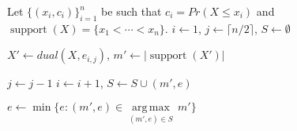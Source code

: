 \documentclass[letterpaper]{article} %
\DeclareMathOperator{\supp}{support}
\begin{document}
\begin{algorithm}
	\DontPrintSemicolon
	Let $\{(x_i, c_i)\}_{i=1}^n$ be such that $c_i=Pr(X \leq x_i)$ and $\supp(X)=\{x_1 < \cdots < x_n\}$.\;
    $i \gets 1$, $j \gets \lceil n/2 \rceil$, $S \gets \emptyset$\;

	{
		
		
		$X' \gets dual(X,e_{i,j})$, $m' \gets |\supp(X')|$\;
	
		{
			$j \gets j - 1$
		}
		 {
			$i \gets i + 1$, $S \gets S \cup (m',e)$			
		}
	}
	$e \gets \min\{e\colon (m',e) \in \underset{(m',e)\in S}{\operatorname{arg\,max}}\, m'\}$\;
	
	\caption{$saddlebackApprox(X,m)$}   
	\label{alg:saddleback}
\end{algorithm}
\end{document}
